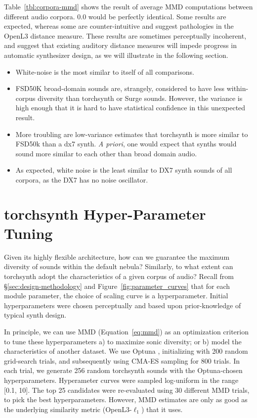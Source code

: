Table~\ref{tbl:corpora-mmd} shows the result of average MMD computations between different audio corpora. 0.0 would be perfectly identical. Some results are expected, whereas some are counter-intuitive and suggest pathologies in the OpenL3 distance measure. These results are sometimes perceptually incoherent, and suggest that existing auditory distance measures will impede progress in automatic synthesizer design, as we will illustrate in the following section.


\begin{itemize}
    \item White-noise is the most similar to itself of all comparisons.
    \item FSD50K broad-domain sounds are, strangely, considered to have less within-corpus diversity than torchsynth or Surge sounds. However, the variance is high enough that it is hard to have statistical confidence in this unexpected result.
    \item More troubling are low-variance estimates that torchsynth is more similar to FSD50k than a dx7 synth. {\em A priori}, one would expect that synths would sound more similar to each other than broad domain audio. %
    \item As expected, white noise is the least similar to DX7 synth sounds of all corpora, as the DX7 has no noise oscillator.
\end{itemize}



\section{torchsynth Hyper-Parameter Tuning}
\label{sec:hyperparameter-tuning}

Given its highly flexible architecture, how can we guarantee the maximum diversity of sounds within the default nebula? Similarly, to what extent can torchsynth adopt the characteristics of a given corpus of audio? Recall from \S\ref{sec:design-methodology} and Figure~\ref{fig:parameter_curves} that for each module parameter, the choice of scaling curve is a hyperparameter. Initial hyperparameters were chosen perceptually and based upon prior-knowledge of typical synth design.

In principle, we can use MMD (Equation~\ref{eq:mmd}) as an optimization criterion to tune these hyperparameters a) to maximize sonic diversity; or b) model the characteristics of another dataset. We use Optuna \cite{optuna_2019}, initializing with 200 random grid-search trials, and subsequently using CMA-ES sampling for 800 trials. In each trial, we generate 256 random torchsynth sounds with the Optuna-chosen hyperparameters. %
Hyperameter curves were sampled log-uniform in the range [0.1, 10]. The top 25 candidates were re-evaluated using 30 different MMD trials, to pick the best hyperparameters. However, MMD estimates are only as good as the underlying similarity metric (OpenL3-$\ell_1$) that it uses.

